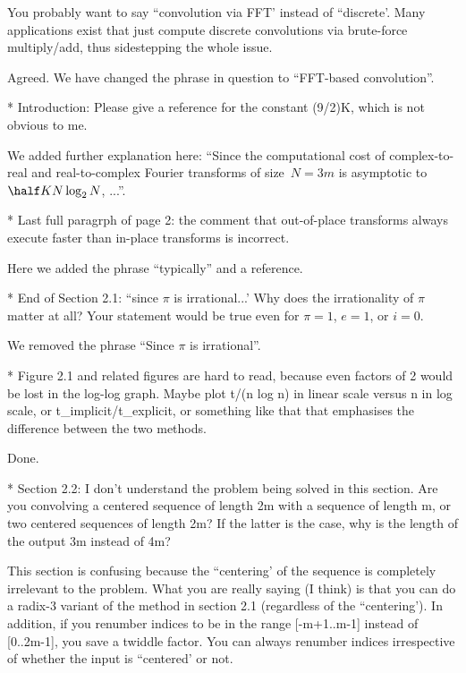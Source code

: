 \documentclass[11pt]{letter}
\begin{document}
\begin{letter}
 You probably want to say ``convolution via FFT' instead of 
 ``discrete'. Many applications exist that just compute discrete 
 convolutions via brute-force multiply/add, thus sidestepping the 
 whole issue. 
\eq
 
Agreed. We have changed the phrase in question to ``FFT-based convolution''.

\bq
* Introduction: Please give a reference for the constant (9/2)K, which 
 is not obvious to me. 
\eq
 
We added further explanation here:
``Since the computational cost of complex-to-real and real-to-complex Fourier
transforms of size~$N=3m$ is asymptotic to $\half K N\log_2 N$, ...''.

\bq
* Last full paragrph of page 2: the comment that out-of-place 
 transforms always execute faster than in-place transforms is 
 incorrect. 
\eq
 
Here we added the phrase ``typically'' and a reference.

\bq
* End of Section 2.1: ``since $\pi$ is irrational...' Why 
 does the irrationality of $\pi$ matter at all? Your statement 
 would be true even for $\pi=1$, $e=1$, or $i=0$. 
\eq
 
We removed the phrase ``Since $\pi$ is irrational''.

\bq
* Figure 2.1 and related figures are hard to read, because even 
 factors of 2 would be lost in the log-log graph. Maybe plot 
 t/(n log n) in linear scale versus n in log scale, or t\_implicit/t\_explicit, 
 or something like that that emphasises the difference between the 
 two methods. 
\eq
 
Done.

\bq
* Section 2.2: I don't understand the problem being solved in this 
 section. Are you convolving a centered sequence of length 2m 
 with a sequence of length m, or two centered sequences of length 
 2m? If the latter is the case, why is the length of the output 
 3m instead of 4m? 
 
 This section is confusing because the ``centering' of the sequence 
 is completely irrelevant to the problem. What you are really saying 
 (I think) is that you can do a radix-3 variant of the method in 
 section 2.1 (regardless of the ``centering'). In addition, if you 
 renumber indices to be in the range [-m+1..m-1] instead of 
 [0..2m-1], you save a twiddle factor. You can always renumber 
 indices irrespective of whether the input is ``centered' or not. 
\eq


\end{letter}
\end{document}
